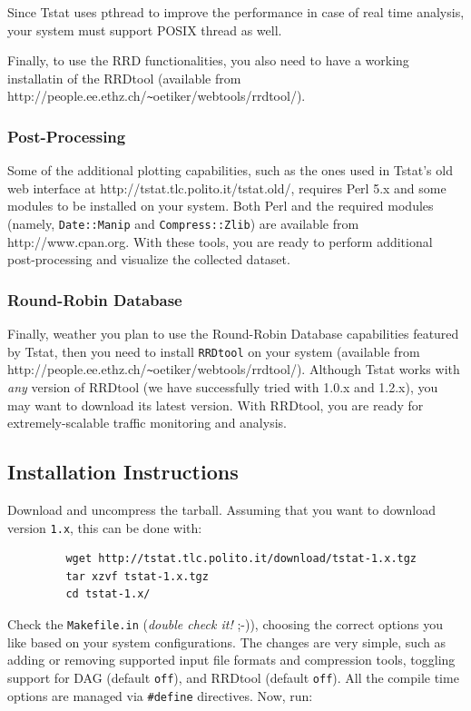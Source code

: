 \documentclass[11pt]{article}
\begin{document}
Since Tstat uses pthread to improve the performance in case of real time
analysis, your system must support POSIX thread as well.



Finally, to use the RRD functionalities, you also need to have a working
installatin of the RRDtool (available from
\textsf{http://people.ee.ethz.ch/\texttt{\~{}}oetiker/webtools/rrdtool/}).

\subsubsection{Post-Processing\label{Post-Processing}}


Some of the additional plotting capabilities, such
as the ones used in Tstat's old web interface at
\textsf{http://tstat.tlc.polito.it/tstat.old/}, requires
Perl 5.x and some modules to be installed on your system. 
Both Perl and the required modules (namely, \texttt{Date::Manip}
and \texttt{Compress::Zlib}) are available from \textsf{http://www.cpan.org}.
With these tools, you are ready to perform additional 
post-processing  and visualize the collected dataset.

\subsubsection{Round-Robin Database\label{Round-Robin_Database}}


Finally, weather you plan to use the Round-Robin Database
capabilities featured by Tstat, then you need to install
\texttt{RRDtool} on your system (available from
\textsf{http://people.ee.ethz.ch/\texttt{\~{}}oetiker/webtools/rrdtool/}).
Although Tstat works
with \textit{any} version of RRDtool (we have successfully tried 
with 1.0.x and 1.2.x), you may want to download its latest 
version. With RRDtool, you are ready for extremely-scalable 
traffic monitoring and analysis.

\subsection{Installation Instructions\label{Installation_Instructions}}


Download and uncompress the tarball. Assuming
that you want to download version \texttt{1.x}, this can be done with:

\begin{small}\begin{verbatim}
         wget http://tstat.tlc.polito.it/download/tstat-1.x.tgz
         tar xzvf tstat-1.x.tgz
         cd tstat-1.x/
\end{verbatim}\end{small} \noindent
Check the \texttt{Makefile.in} (\textit{double check it!} ;-)), choosing the correct options
you like  based on your system configurations. The changes are very simple, such
as adding or removing supported input file formats and compression tools,
toggling support for DAG (default \texttt{off}), and RRDtool (default \texttt{off}). All the
compile time options are managed via \texttt{\#define} directives.  Now, run:
\end{document}
